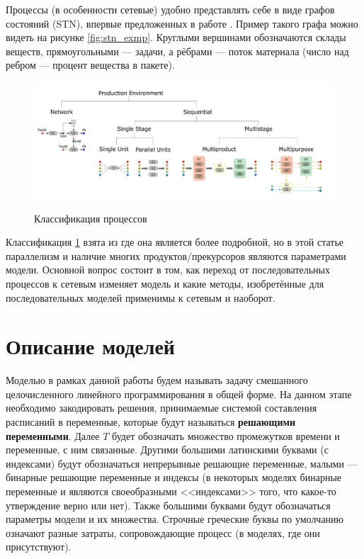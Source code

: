 \documentclass[12pt, twoside]{article}
\theoremstyle{definition}
\begin{document}
Процессы (в особенности сетевые) удобно представлять себе в виде графов состояний (STN), впервые предложенных в работе \cite{stnoriginal}. Пример такого графа можно видеть на рисунке \ref{fig:stn_exmp}. Круглыми вершинами обозначаются склады веществ, прямоугольными --- задачи, а рёбрами --- поток материала (число над ребром --- процент вещества в пакете).

\begin{figure}[h]
\caption{Классификация процессов}
\centering
\includegraphics[width=1.0\textwidth]{классификация процессов}
\label{fig:clas_proc}
\end{figure}

Классификация \ref{fig:clas_proc} взята из \cite{reallife} где она является более подробной, но в этой статье параллелизм и наличие многих продуктов/прекурсоров являются параметрами модели. Основной вопрос состоит в том, как переход от последовательных процессов к сетевым изменяет модель и какие методы, изобретённые для последовательных моделей применимы к сетевым и наоборот. 

\section{Описание моделей}

Моделью в рамках данной работы будем называть задачу смешанного целочисленного линейного программирования в общей форме. На данном этапе необходимо закодировать решения, принимаемые системой составления расписаний в переменные, которые будут называться \textbf{решающими переменными}. Далее $T$ будет обозначать множество промежутков времени и переменные, с ним связанные. Другими большими латинскими буквами (с индексами) будут обозначаться непрерывные решающие переменные, малыми --- бинарные решающие переменные и индексы (в некоторых моделях бинарные переменные и являются своеобразными <<индексами>> того, что какое-то утверждение верно или нет). Также большими буквами будут обозначаться параметры модели и их множества. Строчные греческие буквы по умолчанию означают разные затраты, сопровождающие процесс (в моделях, где они присутствуют).
\end{document}
